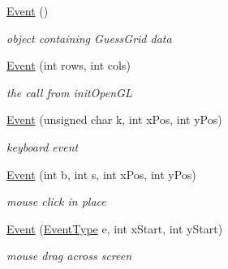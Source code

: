 \begin{DoxyCompactItemize}
\item 
\hyperlink{structEvent_a5a40dd4708297f7031e29b39e039ae10}{Event} ()
\begin{DoxyCompactList}\small\item\em object containing Guess\+Grid data \end{DoxyCompactList}\item 
\hypertarget{structEvent_a89fff1e6d2c2b40891c118cbfffbe47a}{}\hyperlink{structEvent_a89fff1e6d2c2b40891c118cbfffbe47a}{Event} (int rows, int cols)\label{structEvent_a89fff1e6d2c2b40891c118cbfffbe47a}

\begin{DoxyCompactList}\small\item\em the call from init\+Open\+G\+L \end{DoxyCompactList}\item 
\hypertarget{structEvent_a1de84dca9afcccd3025d136995c8da81}{}\hyperlink{structEvent_a1de84dca9afcccd3025d136995c8da81}{Event} (unsigned char k, int x\+Pos, int y\+Pos)\label{structEvent_a1de84dca9afcccd3025d136995c8da81}

\begin{DoxyCompactList}\small\item\em keyboard event \end{DoxyCompactList}\item 
\hypertarget{structEvent_a459325ca9826cb3f934721743927eba3}{}\hyperlink{structEvent_a459325ca9826cb3f934721743927eba3}{Event} (int b, int s, int x\+Pos, int y\+Pos)\label{structEvent_a459325ca9826cb3f934721743927eba3}

\begin{DoxyCompactList}\small\item\em mouse click in place \end{DoxyCompactList}\item 
\hypertarget{structEvent_a83a5f2845a85878320b5c38b86562a4f}{}\hyperlink{structEvent_a83a5f2845a85878320b5c38b86562a4f}{Event} (\hyperlink{util_8h_a2628ea8d12e8b2563c32f05dc7fff6fa}{Event\+Type} e, int x\+Start, int y\+Start)\label{structEvent_a83a5f2845a85878320b5c38b86562a4f}

\begin{DoxyCompactList}\small\item\em mouse drag across screen \end{DoxyCompactList}\end{DoxyCompactItemize}
